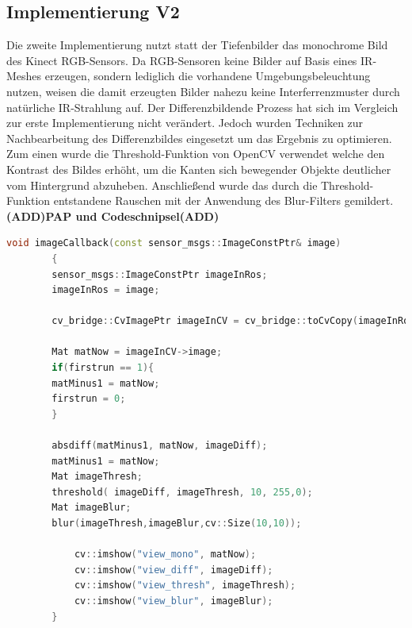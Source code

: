 		\subsection{Implementierung V2}
		Die zweite Implementierung nutzt statt der Tiefenbilder das monochrome Bild des Kinect RGB-Sensors. Da RGB-Sensoren keine Bilder auf Basis eines IR-Meshes erzeugen, sondern lediglich die vorhandene Umgebungsbeleuchtung nutzen, weisen die damit erzeugten Bilder nahezu keine Interferrenzmuster durch natürliche IR-Strahlung auf. Der Differenzbildende Prozess hat sich im Vergleich zur erste Implementierung nicht verändert. Jedoch wurden Techniken zur Nachbearbeitung des Differenzbildes eingesetzt um das Ergebnis zu optimieren. Zum einen wurde die Threshold-Funktion von OpenCV verwendet welche den Kontrast des Bildes erhöht, um die Kanten sich bewegender Objekte deutlicher vom Hintergrund abzuheben. Anschließend wurde das durch die Threshold-Funktion entstandene Rauschen mit der Anwendung des Blur-Filters gemildert.\\
		\textbf{(ADD)PAP und Codeschnipsel(ADD)}
		\newpage
		\begin{lstlisting}[caption=imageCallbackV2 Funktion des Objekt-Erkennungs nodes, label=imageCallback-V2, title=imageCallback-V2, language=C++]
		void imageCallback(const sensor_msgs::ImageConstPtr& image)
		{
		sensor_msgs::ImageConstPtr imageInRos;
		imageInRos = image;
		
		cv_bridge::CvImagePtr imageInCV = cv_bridge::toCvCopy(imageInRos);
		
		Mat matNow = imageInCV->image;
		if(firstrun == 1){
		matMinus1 = matNow;
		firstrun = 0;
		}
		
		absdiff(matMinus1, matNow, imageDiff);
		matMinus1 = matNow;
		Mat imageThresh;
		threshold( imageDiff, imageThresh, 10, 255,0);
		Mat imageBlur;
		blur(imageThresh,imageBlur,cv::Size(10,10));
		
		    cv::imshow("view_mono", matNow);
		    cv::imshow("view_diff", imageDiff);
		    cv::imshow("view_thresh", imageThresh);
		    cv::imshow("view_blur", imageBlur);
		}
		\end{lstlisting}
		
